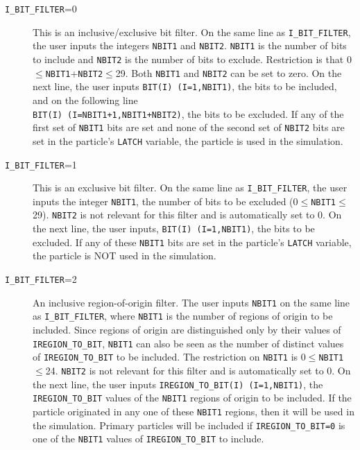 \documentclass[12pt,twoside]{article}      %
\newcommand{\indexm}[1]{\index{#1}}
\begin{document}
\begin{description}
\indexm{I\_BIT\_FILTER}
\indexm{NBIT1}
\indexm{NBIT2}
\indexm{BIT}
\item [{\tt I\_BIT\_FILTER}=0] This is an inclusive/exclusive bit filter.  On the
same line as {\tt I\_BIT\_FILTER}, the user inputs the integers {\tt NBIT1} and
{\tt NBIT2}.  {\tt NBIT1} is the number of bits to include and {\tt NBIT2} is
the number of bits to exclude.  Restriction is that
0$\leq${\tt NBIT1}+{\tt NBIT2}$\leq$29.
Both {\tt NBIT1} and {\tt NBIT2} can be set to zero.  On the next line, the
user inputs {\tt BIT(I) (I=1,NBIT1)}, the bits to be included, and on
the following line \\ {\tt BIT(I) (I=NBIT1+1,NBIT1+NBIT2)}, the bits to
be excluded.  If any of the first set of {\tt NBIT1} bits are set and none
of the second set of {\tt NBIT2} bits are set in the particle's {\tt LATCH}
variable, the particle is used in the
simulation.

\item [{\tt I\_BIT\_FILTER}=1] This is an exclusive bit filter.  On the same line
as {\tt I\_BIT\_FILTER}, the user inputs the integer {\tt NBIT1}, the
number of bits to be excluded (0$\leq${\tt NBIT1}$\leq$29).  {\tt NBIT2} is
not relevant for this filter and is automatically set to 0.  On the
next line, the user inputs, {\tt BIT(I) (I=1,NBIT1)}, the bits to
be excluded.  If any of these {\tt NBIT1} bits are set in the particle's
{\tt LATCH} variable, the particle
is NOT used in the simulation.

\item [{\tt I\_BIT\_FILTER}=2] An inclusive region-of-origin filter.
The user inputs {\tt NBIT1} on the same line
as {\tt I\_BIT\_FILTER}, where {\tt NBIT1} is the number of regions of origin
to be included.  Since regions of origin are distinguished only by their
values of {\tt IREGION\_TO\_BIT}, {\tt NBIT1} can also be seen as the
number of distinct values of {\tt IREGION\_TO\_BIT} to be included. The
restriction on {\tt NBIT1} is 0$\leq${\tt NBIT1}$\leq$24.  {\tt NBIT2} is
not relevant for this filter and is automatically set to 0.  On the
next line, the user inputs {\tt IREGION\_TO\_BIT(I) (I=1,NBIT1)}, the
{\tt IREGION\_TO\_BIT} values of the {\tt NBIT1} regions of origin to
be included.  If the particle originated in any one of these {\tt NBIT1}
regions, then it will be used in the simulation.  Primary particles will be included if
{\tt IREGION\_TO\_BIT=0} is one of the {\tt NBIT1} values of
{\tt IREGION\_TO\_BIT} to include.


\end{description}
\end{document}
